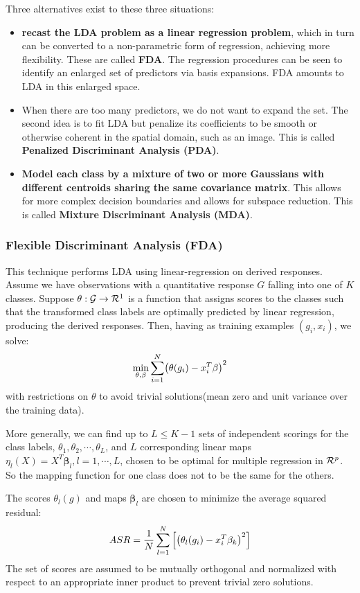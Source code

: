 \documentclass[12pt, letterpaper]{article}
\theoremstyle{definition}
\newcommand{\be}{\mathbf{\beta}}
\DeclarePairedDelimiter\autobracket{(}{)}
\newcommand{\br}[1]{\autobracket*{#1}}
\begin{document}
Three alternatives exist to these three situations:
\begin{itemize}
\item \textbf{recast the LDA problem as a linear regression problem}, which in turn can be converted to a non-parametric form of regression, achieving more flexibility. These are called \textbf{FDA}. The regression procedures can be seen to identify an enlarged set of predictors via basis expansions. FDA amounts to LDA in this enlarged space.
\item When there are too many predictors, we do not want to expand the set. The second idea is to fit LDA but penalize its coefficients to be smooth or otherwise coherent in the spatial domain, such as an image. This is called \textbf{Penalized Discriminant Analysis (PDA)}.
\item \textbf{Model each class by a mixture of two or more Gaussians with different centroids sharing the same covariance matrix}. This allows for more complex decision boundaries and allows for subspace reduction. This is called \textbf{Mixture Discriminant Analysis (MDA)}.
\end{itemize}

\subsubsection{Flexible Discriminant Analysis (FDA)}
This technique performs LDA using linear-regression on derived responses.
Assume we have observations with a quantitative response $G$ falling into one of $K$ classes. Suppose $\theta:\CMcal{G} \rightarrow \CMcal{R}^1$ is a function that assigns scores to the classes such that the transformed class labels are optimally predicted by linear regression, producing the derived responses. Then, having as training examples $(g_i, x_i)$, we solve:
\begin{equation}
\min_{\theta, \be} \sum_{i=1}^N \br{\theta(g_i)-x_i^T\be}^2
\end{equation}
with restrictions on $\theta$ to avoid trivial solutions(mean zero and unit variance over the training data).

More generally, we can find up to $L \le K-1 $ sets of independent scorings for the class labels, $\theta_1, \theta_2, \cdots , \theta_L$, and $L$ corresponding linear maps $\eta_l(X) = X^T \be_l, l = 1,\cdots, L$, chosen to be optimal for multiple regression in $\CMcal{R}^p$. So the mapping function for one class does not to be the same for the others.

The scores $\theta_l(g)$ and maps $\be_l$ are chosen to minimize the average squared residual:
\begin{equation}
ASR = \frac{1}{N}\sum_{l=1}^N\left[ \br{\theta_l(g_i) - x_i^T\be_k}^2\right]
\end{equation}
The set of scores are assumed to be mutually orthogonal and normalized with respect to an appropriate inner product to prevent trivial zero solutions.
\end{document}
